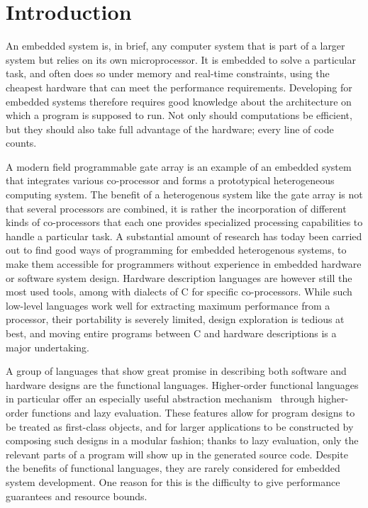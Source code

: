 \documentclass[../paper.tex]{subfiles}
\begin{document}
\chapter{Introduction}
\label{intro}

An embedded system is, in brief, any computer system that is part of a larger system but relies on its own microprocessor. It is embedded to solve a particular task, and often does so under memory and real-time constraints, using the cheapest hardware that can meet the performance requirements. Developing for embedded systems therefore requires good knowledge about the architecture on which a program is supposed to run. Not only should computations be efficient, but they should also take full advantage of the hardware; every line of code counts.

A modern field programmable gate array is an example of an embedded system that integrates various co-processor and forms a prototypical heterogeneous computing system. The benefit of a heterogenous system like the gate array is not that several processors are combined, it is rather the incorporation of different kinds of co-processors that each one provides specialized processing capabilities to handle a particular task. A substantial amount of research has today been carried out to find good ways of programming for embedded heterogenous systems, to make them accessible for programmers without experience in embedded hardware or software system design. Hardware description languages are however still the most used tools, among with dialects of C for specific co-processors. While such low-level languages work well for extracting maximum performance from a processor, their portability is severely limited, design exploration is tedious at best, and moving entire programs between C and hardware descriptions is a major undertaking.

A group of languages that show great promise in describing both software and hardware designs are the functional languages. Higher-order functional languages in particular offer an especially useful abstraction mechanism~\cite{baaij2010, bjesse1998, gill2010} through higher-order functions and lazy evaluation. These features allow for program designs to be treated as first-class objects, and for larger applications to be constructed by composing such designs in a modular fashion; thanks to lazy evaluation, only the relevant parts of a program will show up in the generated source code. Despite the benefits of functional languages, they are rarely considered for embedded system development. One reason for this is the difficulty to give performance guarantees and resource bounds.
\end{document}
